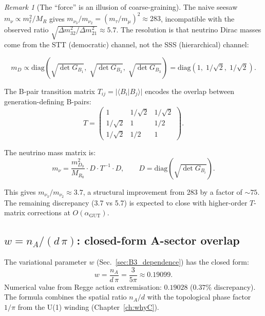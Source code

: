 \documentclass[12pt]{article}
\theoremstyle{remark}
\newtheorem{remark}[theorem]{Remark}
\theoremstyle{definition}
\newcommand{\agut}{\alpha_{\mathrm{GUT}}}
\begin{document}
\begin{remark}[The ``force'' is an illusion of coarse-graining]
The naive seesaw $m_\nu \propto m_\ell^2 / M_R$ gives $m_{\nu_3}/m_{\nu_2} = (m_\tau/m_\mu)^2 \approx 283$, incompatible with the observed ratio $\sqrt{\Delta m^2_{32}/\Delta m^2_{21}} \approx 5.7$.  The resolution is that neutrino Dirac masses come from the STT (democratic) channel, not the SSS (hierarchical) channel:

\begin{equation}
m_D \propto \text{diag}(\sqrt{\det G_{B_1}},\; \sqrt{\det G_{B_2}},\; \sqrt{\det G_{B_3}}) = \text{diag}(1,\; 1/\sqrt{2},\; 1/\sqrt{2}).
\end{equation}

The B-pair transition matrix $T_{ij} = |\langle B_i | B_j \rangle|$ encodes the overlap between generation-defining B-pairs:
\begin{equation}
T = \begin{pmatrix} 1 & 1/\sqrt{2} & 1/\sqrt{2} \\ 1/\sqrt{2} & 1 & 1/2 \\ 1/\sqrt{2} & 1/2 & 1 \end{pmatrix}.
\end{equation}

The neutrino mass matrix is:
\begin{equation}
m_\nu = \frac{m_{D_0}^2}{M_{R_0}} \cdot D \cdot T^{-1} \cdot D, \qquad D = \text{diag}(\sqrt{\det G_{B_i}}).
\end{equation}

This gives $m_{\nu_3}/m_{\nu_2} \approx 3.7$, a structural improvement from 283 by a factor of $\sim 75$.  The remaining discrepancy (3.7 vs 5.7) is expected to close with higher-order $T$-matrix corrections at $O(\agut)$.

\subsection{$w = n_A/(d\,\pi)$: closed-form A-sector overlap}
\label{sec:w_closed}

The variational parameter $w$ (Sec.~\ref{sec:B3_dependence}) has the closed form:
\begin{equation}
\boxed{w = \frac{n_A}{d\,\pi} = \frac{3}{5\pi} \approx 0.19099.}
\end{equation}
Numerical value from Regge action extremisation: $0.19028$ ($0.37\%$ discrepancy).  The formula combines the spatial ratio $n_A/d$ with the topological phase factor $1/\pi$ from the U(1) winding (Chapter~\ref{ch:whyC}).


\end{remark}
\end{document}
